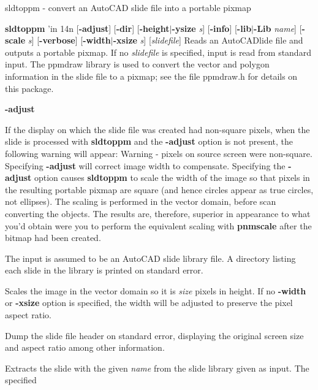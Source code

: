 sldtoppm - convert an AutoCAD slide file into a portable pixmap
\raggedright
{\bf sldtoppm}
'in 14n
{\rm [}{\bf -adjust}{\rm ]}
{\rm [}{\bf -dir}{\rm ]}
{\rm [}{\bf -height}{\rm $|$}{\bf -ysize}
{\it s}{\rm ]}
{\rm [}{\bf -info}{\rm ]}
{\rm [}{\bf -lib}{\rm $|$}{\bf -Lib}
{\it name}{\rm ]}
{\rm [}{\bf -scale}
{\it s}{\rm ]}
{\rm [}{\bf -verbose}{\rm ]}
{\rm [}{\bf -width}{\rm $|$}{\bf -xsize}
{\it s}{\rm ]}
{\rm [}{\it slidefile}{\rm ]}
\ind{-7.0em}
Reads an AutoCAD{l}ide file and outputs a portable pixmap.
If no
{\it slidefile}
is specified, input is read from standard input.
The ppmdraw library is used to convert the vector and polygon
information in the slide file to a pixmap; see the file ppmdraw.h for
details on this package.
\begin{TPlist}{{\bf -adjust}}
\item[{{\bf -adjust}}]
If the display on which the slide file was created had non-square
pixels, when the slide is processed with
{\bf sldtoppm}
and the
{\bf -adjust}
option is not present, the following warning will appear:
\ind{-6.8in}
Warning - pixels on source screen were non-square.
\nwl
Specifying
{\bf -adjust}
will correct image width to compensate.
\ind{-7.0in}
Specifying the
{\bf -adjust}
option causes
{\bf sldtoppm}
to scale the width of the image so that pixels in the resulting
portable pixmap are square (and hence circles appear as true circles,
not ellipses).  The scaling is performed in the vector domain, before
scan converting the objects.  The results are, therefore, superior in
appearance to what you'd obtain were you to perform the equivalent
scaling with
{\bf pnmscale}
after the bitmap had been created.
\item[{{\bf -dir}}]
The input is assumed to be an AutoCAD slide library file.  A directory
listing each slide in the library is printed on standard error.
\item[{{\bf -height}{\it \ size}
}]
Scales the image in the vector domain so it is
{\it size}
pixels in height.  If no
{\bf -width}
or
{\bf -xsize}
option is specified, the width will be adjusted to preserve the
pixel aspect ratio. 
\item[{{\bf -info}}]
Dump the slide file header on standard error, displaying the original
screen size and aspect ratio among other information.
\item[{{\bf -lib}{\it \ name}
}]
Extracts the slide with the given
{\it name}
from the slide library given as input.  The specified

\end{TPlist}
